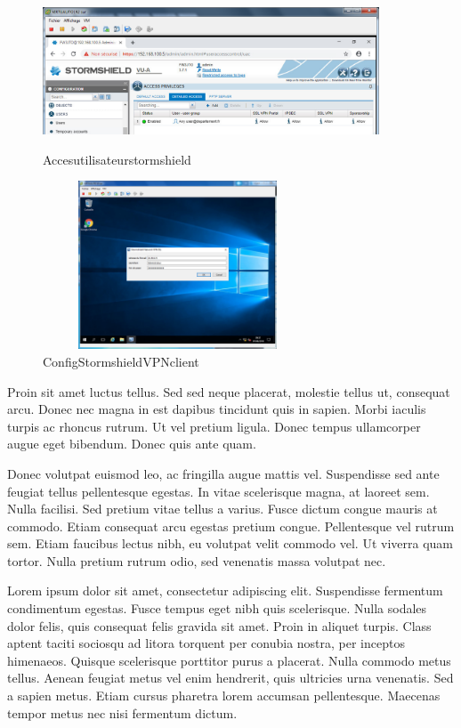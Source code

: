 \documentclass{report}
\begin{document}
\begin{figure}[!ht]
\begin{minipage}[t]{.46\linewidth}
\centering\includegraphics[width=10cm]{./images/images/Accesutilisateurstormshield}
\caption{Accesutilisateurstormshield}
\end{minipage}
\begin{minipage}[t]{.60\linewidth}
\centering\includegraphics[width=8cm, height=5cm]{./images/images/ConfigStormshieldVPNclient}
\caption{ConfigStormshieldVPNclient}
\end{minipage}
\end{figure}
Proin sit amet luctus tellus. Sed sed neque placerat, molestie tellus ut, consequat arcu. Donec nec magna in est dapibus tincidunt quis in sapien. Morbi iaculis turpis ac rhoncus rutrum. Ut vel pretium ligula. Donec tempus ullamcorper augue eget bibendum. Donec quis ante quam.

Donec volutpat euismod leo, ac fringilla augue mattis vel. Suspendisse sed ante feugiat tellus pellentesque egestas. In vitae scelerisque magna, at laoreet sem. Nulla facilisi. Sed pretium vitae tellus a varius. Fusce dictum congue mauris at commodo. Etiam consequat arcu egestas pretium congue. Pellentesque vel rutrum sem. Etiam faucibus lectus nibh, eu volutpat velit commodo vel. Ut viverra quam tortor. Nulla pretium rutrum odio, sed venenatis massa volutpat nec.


Lorem ipsum dolor sit amet, consectetur adipiscing elit. Suspendisse fermentum condimentum egestas. Fusce tempus eget nibh quis scelerisque. Nulla sodales dolor felis, quis consequat felis gravida sit amet. Proin in aliquet turpis. Class aptent taciti sociosqu ad litora torquent per conubia nostra, per inceptos himenaeos. Quisque scelerisque porttitor purus a placerat. Nulla commodo metus tellus. Aenean feugiat metus vel enim hendrerit, quis ultricies urna venenatis. Sed a sapien metus. Etiam cursus pharetra lorem accumsan pellentesque. Maecenas tempor metus nec nisi fermentum dictum.
\end{document}
